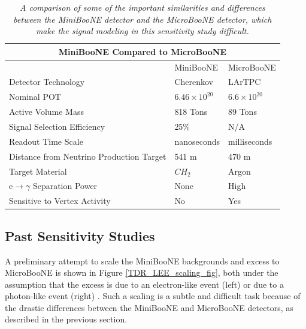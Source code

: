 \begin{table}
\begin{tabular}{ |p{5cm}|p{3.5cm}|p{3.5cm}|  }
 \hline
 \multicolumn{3}{|c|}{MiniBooNE Compared to MicroBooNE} \\
 \hline
   & MiniBooNE & MicroBooNE \\
 \hline \hline
 Detector Technology & Cherenkov & LArTPC\\\hline
 Nominal POT & $6.46\times10^{20}$ & $6.6\times10^{20}$ \\\hline
 Active Volume Mass & 818 Tons & 89 Tons \\\hline
 Signal Selection Efficiency & 25\% & N/A \\\hline
 Readout Time Scale & nanoseconds & milliseconds \\\hline
 Distance from Neutrino Production Target & 541 m & 470 m \\\hline
 Target Material & $CH_2$ & Argon \\\hline
 e$\rightarrow\gamma$ Separation Power & None & High \\\hline
 Sensitive to Vertex Activity & No & Yes \\\hline
 \hline
\end{tabular}
\caption{\textit{A comparison of some of the important similarities and differences between the MiniBooNE detector and the MicroBooNE detector, which make the signal modeling in this sensitivity study difficult.}}\label{UB_MB_comparison_table}
\end{table}


\subsection{Past Sensitivity Studies}\label{georgia_scaling_description}

A preliminary attempt to scale the MiniBooNE backgrounds and excess to MicroBooNE is shown in Figure \ref{TDR_LEE_scaling_fig}, both under the assumption that the excess is due to an electron-like event (left) or due to a photon-like event (right) \cite{UBTDR}. Such a scaling is a subtle and difficult task because of the drastic differences between the MiniBooNE and MicroBooNE detectors, as described in the previous section.\\

